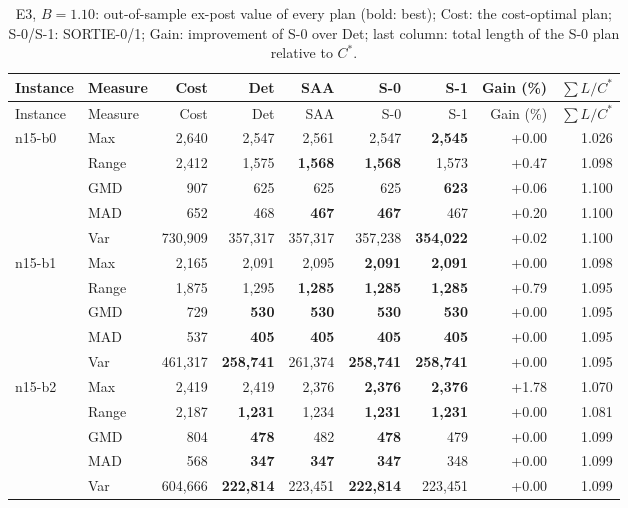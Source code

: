 \begin{small}
\begin{longtable}{llrrrrrrr}
\caption{E3, $B=1.10$: out-of-sample ex-post value of every plan (bold: best); Cost: the cost-optimal plan; S-0/S-1: SORTIE-0/1; Gain: improvement of S-0 over Det; last column: total length of the S-0 plan relative to $C^\ast$.}\label{tab:app_e3_110}\\
\toprule
Instance & Measure & Cost & Det & SAA & S-0 & S-1 & Gain (\%) & $\sum L/C^\ast$\\
\midrule
\endfirsthead
\toprule
Instance & Measure & Cost & Det & SAA & S-0 & S-1 & Gain (\%) & $\sum L/C^\ast$\\
\midrule
\endhead
\bottomrule
\endfoot
n15-b0 & Max & 2,640 & 2,547 & 2,561 & 2,547 & \textbf{2,545} & +0.00 & 1.026 \\
 & Range & 2,412 & 1,575 & \textbf{1,568} & \textbf{1,568} & 1,573 & +0.47 & 1.098 \\
 & GMD & 907 & 625 & 625 & 625 & \textbf{623} & +0.06 & 1.100 \\
 & MAD & 652 & 468 & \textbf{467} & \textbf{467} & 467 & +0.20 & 1.100 \\
 & Var & 730,909 & 357,317 & 357,317 & 357,238 & \textbf{354,022} & +0.02 & 1.100 \\
n15-b1 & Max & 2,165 & 2,091 & 2,095 & \textbf{2,091} & \textbf{2,091} & +0.00 & 1.098 \\
 & Range & 1,875 & 1,295 & \textbf{1,285} & \textbf{1,285} & \textbf{1,285} & +0.79 & 1.095 \\
 & GMD & 729 & \textbf{530} & \textbf{530} & \textbf{530} & \textbf{530} & +0.00 & 1.095 \\
 & MAD & 537 & \textbf{405} & \textbf{405} & \textbf{405} & \textbf{405} & +0.00 & 1.095 \\
 & Var & 461,317 & \textbf{258,741} & 261,374 & \textbf{258,741} & \textbf{258,741} & +0.00 & 1.095 \\
n15-b2 & Max & 2,419 & 2,419 & 2,376 & \textbf{2,376} & \textbf{2,376} & +1.78 & 1.070 \\
 & Range & 2,187 & \textbf{1,231} & 1,234 & \textbf{1,231} & \textbf{1,231} & +0.00 & 1.081 \\
 & GMD & 804 & \textbf{478} & 482 & \textbf{478} & 479 & +0.00 & 1.099 \\
 & MAD & 568 & \textbf{347} & \textbf{347} & \textbf{347} & 348 & +0.00 & 1.099 \\
 & Var & 604,666 & \textbf{222,814} & 223,451 & \textbf{222,814} & 223,451 & +0.00 & 1.099 \\

\end{longtable}
\end{small}

